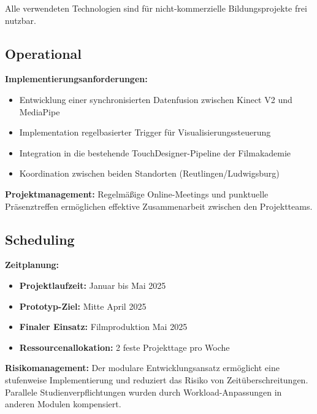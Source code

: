 Alle verwendeten Technologien sind für nicht-kommerzielle Bildungsprojekte frei nutzbar.

\subsection{Operational}

\textbf{Implementierungsanforderungen:}
\begin{itemize}
    \item Entwicklung einer synchronisierten Datenfusion zwischen Kinect V2 und MediaPipe
    \item Implementation regelbasierter Trigger für Visualisierungssteuerung
    \item Integration in die bestehende TouchDesigner-Pipeline der Filmakademie
    \item Koordination zwischen beiden Standorten (Reutlingen/Ludwigsburg)
\end{itemize}

\textbf{Projektmanagement:}
Regelmäßige Online-Meetings und punktuelle Präsenztreffen ermöglichen effektive Zusammenarbeit zwischen den Projektteams.

\subsection{Scheduling}

\textbf{Zeitplanung:}
\begin{itemize}
    \item \textbf{Projektlaufzeit:} Januar bis Mai 2025
    \item \textbf{Prototyp-Ziel:} Mitte April 2025
    \item \textbf{Finaler Einsatz:} Filmproduktion Mai 2025
    \item \textbf{Ressourcenallokation:} 2 feste Projekttage pro Woche
\end{itemize}

\textbf{Risikomanagement:}
Der modulare Entwicklungsansatz ermöglicht eine stufenweise Implementierung und reduziert das Risiko von Zeitüberschreitungen. Parallele Studienverpflichtungen wurden durch Workload-Anpassungen in anderen Modulen kompensiert.